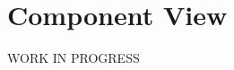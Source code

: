 \documentclass[../../DD.tex]{subfiles}
\begin{document}
\section{Component View}
	WORK IN PROGRESS
	
\end{document}
